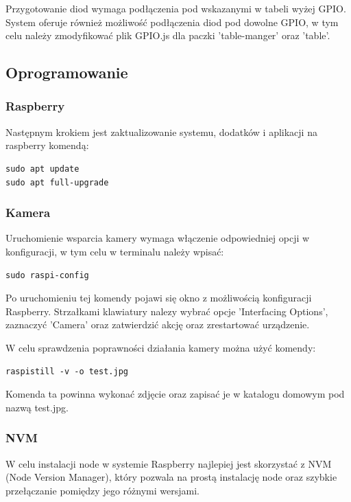 Przygotowanie diod wymaga podłączenia pod wskazanymi w tabeli wyżej GPIO. System oferuje również możliwość podłączenia diod pod dowolne GPIO,  w tym celu należy zmodyfikować plik GPIO.js dla paczki 'table-manger' oraz 'table'.

\subsection{Oprogramowanie}

\subsubsection{Raspberry}

Następnym krokiem jest zaktualizowanie systemu, dodatków i aplikacji na raspberry komendą:

\begin{lstlisting}
sudo apt update
sudo apt full-upgrade
\end{lstlisting}

\subsubsection{Kamera}

Uruchomienie wsparcia kamery wymaga włączenie odpowiedniej opcji w konfiguracji, w tym celu w terminalu należy wpisać:

\begin{lstlisting}
sudo raspi-config
\end{lstlisting}

Po uruchomieniu tej komendy pojawi się okno z możliwością konfiguracji Raspberry. Strzałkami klawiatury nalezy wybrać opcje 'Interfacing Options',  zaznaczyć 'Camera' oraz zatwierdzić akcję oraz zrestartować urządzenie.

W celu sprawdzenia poprawności działania kamery można użyć komendy:

\begin{lstlisting}
raspistill -v -o test.jpg
\end{lstlisting}

Komenda ta powinna wykonać zdjęcie oraz zapisać je w katalogu domowym pod nazwą test.jpg.

\subsubsection{NVM}

W celu instalacji node w systemie Raspberry najlepiej jest skorzystać z NVM (Node Version Manager), który pozwala na prostą instalację node oraz szybkie przełączanie pomiędzy jego różnymi wersjami.

